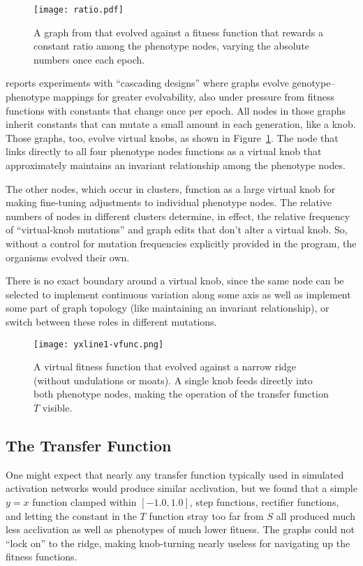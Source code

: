 \documentclass[letterpaper]{article}
\begin{document}
\begin{figure}[b]
  \centering
  \texttt{[image: ratio.pdf]}
  \caption{A graph from \citet{kovitz2015experiments} that evolved against a
    fitness function that rewards a constant ratio among the phenotype nodes,
  varying the absolute numbers once each epoch.}
  \label{fig:virtual-knob}
\end{figure}

\citet{kovitz2015experiments} reports experiments with ``cascading designs''
where graphs evolve genotype--phenotype mappings for greater evolvability, also
under pressure from fitness functions with constants that change once per epoch.
All nodes in those graphs inherit constants that can mutate a small amount in
each generation, like a knob. Those graphs, too, evolve virtual knobs, as shown
in Figure~\ref{fig:virtual-knob}. The node that links directly to all four phenotype nodes functions
as a virtual knob that approximately maintains an invariant relationship
among the phenotype nodes.

The other nodes, which occur in clusters, function as a large virtual knob for
making fine-tuning adjustments to individual phenotype nodes.  The relative
numbers of nodes in different clusters determine, in effect, the relative
frequency of ``virtual-knob mutations'' and graph edits that don't alter a
virtual knob. So, without a control for mutation frequencies explicitly provided
in the program, the organisms evolved their own.

There is no exact boundary around a virtual knob, since the same node can be
selected to implement continuous variation along some axis as well as implement
some part of graph topology (like maintaining an invariant relationship), or
switch between these roles in different mutations.

\begin{figure}[t]
\centering
\texttt{[image: yxline1-vfunc.png]}
\caption{A virtual fitness function that evolved against a narrow ridge
(without undulations or moats). A single knob feeds directly into both
phenotype nodes, making the operation of the transfer function $T$ visible.}
\label{fig:yxline1}
\end{figure}

\subsection{The Transfer Function}

One might expect that nearly any transfer function typically used in simulated
activation networks would produce similar acclivation, but we found that a
simple $y=x$ function clamped within $[-1.0, 1.0]$, step functions, rectifier
functions, and letting the constant in the $T$ function stray too far from $S$
all produced much less acclivation as well as phenotypes of much lower fitness.
The graphs could not ``lock on'' to the ridge, making knob-turning nearly
useless for navigating up the fitness functions.
\end{document}
